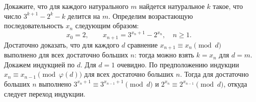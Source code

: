 \problem
Докажите, что для каждого натурального $m$ найдется натуральное $k$ такое, что
число $3^{k+1} - 2^k - k$ делится на $m$.
\solution
Определим возрастающую последовательность $x_n$ следующим образом:
\[
    x_0 = 2
,\qquad
    x_{n+1} = 3^{x_n + 1} - 2^{x_n}
,\quad
    n \geq 1
.\]
Достаточно доказать, что для каждого $d$ сравнение
$x_{n+1} \equiv x_n \pmod{d}$ выполнено для всех достаточно больших $n$:
тогда можно взять $k = x_n$ для $d = m$.
Докажем индукцией по $d$.
Для $d = 1$ очевидно.
По предположению индукции
$x_n \equiv x_{n-1} \pmod{\varphi(d)}$
для всех достаточно больших $n$.
Тогда для достаточно больших $n$ выполнено
$3^{x_n + 1} \equiv 3^{x_{n-1} + 1} \pmod d$ и
$2^{x_n} \equiv 2^{x_{n-1}} \pmod d$,
откуда следует переход индукции.
\endproblem
